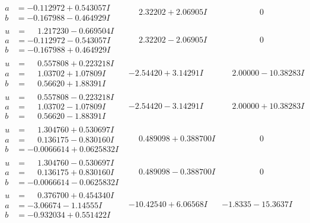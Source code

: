 \documentclass[1p]{elsarticle_modified}
\theoremstyle{definition}
\begin{document}
$$\begin{array}{c|c|c}
\begin{aligned}
a &= -0.112972 + 0.543057 I \\
b &= -0.167988 - 0.464929 I\end{aligned}
 & \phantom{-}2.32202 + 2.06905 I & \phantom{-0.000000 } 0 \\ \hline\begin{aligned}
u &= \phantom{-}1.217230 - 0.669504 I \\
a &= -0.112972 - 0.543057 I \\
b &= -0.167988 + 0.464929 I\end{aligned}
 & \phantom{-}2.32202 - 2.06905 I & \phantom{-0.000000 } 0 \\ \hline\begin{aligned}
u &= \phantom{-}0.557808 + 0.223218 I \\
a &= \phantom{-}1.03702 + 1.07809 I \\
b &= \phantom{-}0.56620 + 1.88391 I\end{aligned}
 & -2.54420 + 3.14291 I & \phantom{-}2.00000 - 10.38283 I \\ \hline\begin{aligned}
u &= \phantom{-}0.557808 - 0.223218 I \\
a &= \phantom{-}1.03702 - 1.07809 I \\
b &= \phantom{-}0.56620 - 1.88391 I\end{aligned}
 & -2.54420 - 3.14291 I & \phantom{-}2.00000 + 10.38283 I \\ \hline\begin{aligned}
u &= \phantom{-}1.304760 + 0.530697 I \\
a &= \phantom{-}0.136175 - 0.830160 I \\
b &= -0.0066614 + 0.0625832 I\end{aligned}
 & \phantom{-}0.489098 + 0.388700 I & \phantom{-0.000000 } 0 \\ \hline\begin{aligned}
u &= \phantom{-}1.304760 - 0.530697 I \\
a &= \phantom{-}0.136175 + 0.830160 I \\
b &= -0.0066614 - 0.0625832 I\end{aligned}
 & \phantom{-}0.489098 - 0.388700 I & \phantom{-0.000000 } 0 \\ \hline\begin{aligned}
u &= \phantom{-}0.376700 + 0.454340 I \\
a &= -3.06674 - 1.14555 I \\
b &= -0.932034 + 0.551422 I\end{aligned}
 & -10.42540 + 6.06568 I & -1.8335 - 15.3637 I \\ \hline\begin{aligned}

\end{aligned}
\end{array}$$
\end{document}
